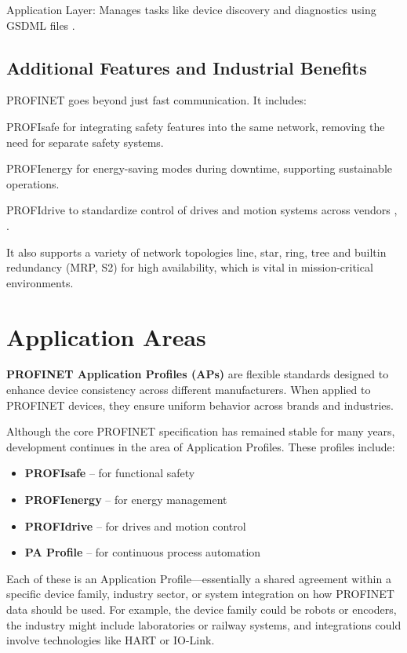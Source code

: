 \documentclass[conference]{IEEEtran}
\begin{document}
Application Layer: Manages tasks like device discovery and diagnostics using GSDML files \cite{patzke1998fieldbus}.

\subsection{Additional Features and Industrial Benefits}
PROFINET goes beyond just fast communication. It includes:

PROFIsafe for integrating safety features into the same network, removing the need for separate safety systems.

PROFIenergy for energy-saving modes during downtime, supporting sustainable operations.

PROFIdrive to standardize control of drives and motion systems across vendors \cite{galloway2012industrial}, \cite{jasperneite2007limits}.

It also supports a variety of network topologies line, star, ring, tree and builtin redundancy (MRP, S2) for high availability, which is vital in mission-critical environments.

\section{Application Areas}
\textbf{PROFINET Application Profiles (APs)} are flexible standards designed to enhance device consistency across different manufacturers. When applied to PROFINET devices, they ensure uniform behavior across brands and industries.

Although the core PROFINET specification has remained stable for many years, development continues in the area of Application Profiles. These profiles include:

\begin{itemize}
    \item \textbf{PROFIsafe} – for functional safety
    \item \textbf{PROFIenergy} – for energy management
    \item \textbf{PROFIdrive} – for drives and motion control
    \item \textbf{PA Profile} – for continuous process automation
\end{itemize}

Each of these is an Application Profile—essentially a shared agreement within a specific device family, industry sector, or system integration on how PROFINET data should be used. For example, the device family could be robots or encoders, the industry might include laboratories or railway systems, and integrations could involve technologies like HART or IO-Link.
\end{document}
